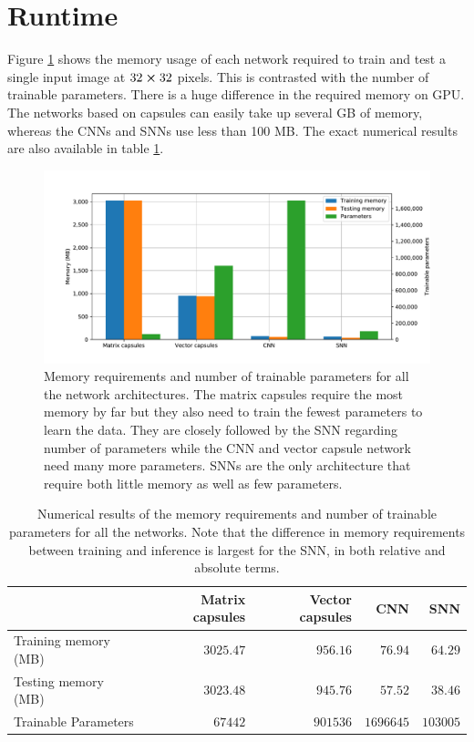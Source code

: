 \section{Runtime}
Figure \ref{fig:memory} shows the memory usage of each network required to train and test a single input image at $32\cross 32$ pixels. This is contrasted with the number of trainable parameters. There is a huge difference in the required memory on GPU. The networks based on capsules can easily take up several GB of memory, whereas the CNNs and SNNs use less than 100 MB. The exact numerical results are also available in table \ref{tab:memory}.
\begin{figure}[H]
    \centering
\includegraphics[clip,trim=1.5cm 0 0 0,width=\textwidth]{figures/memory.pdf}
\caption[Memory requirements and number of trainable parameters for all the networks]{Memory requirements and number of trainable parameters for all the network architectures. The matrix capsules require the most memory by far but they also need to train the fewest parameters to learn the data. They are closely followed by the SNN regarding number of parameters while the CNN and vector capsule network need many more parameters. SNNs are the only architecture that require both little memory as well as few parameters.}\label{fig:memory}
\end{figure}\noindent
\begin{table}[htp!]
\centering
\begin{tabular}{@{}lrrrr@{}}
\toprule
                     & Matrix capsules & Vector capsules & CNN             & SNN            \\ \midrule
Training memory (MB)      & $\num{3025.47}$        & $\num{956.16}$         & $\num{76.94}$   & $\num{64.29}$  \\
Testing memory (MB)       & $\num{3023.48}$        & $\num{945.76}$         & $\num{57.52}$   & $\num{38.46}$  \\
Trainable Parameters & $\num{67442}$          & $\num{901536}$         & $\num{1696645}$ & $\num{103005}$ \\ \bottomrule
\end{tabular}
\caption[Numerical results of the memory requirements and number of trainable parameters for all the networks]{Numerical results of the memory requirements and number of trainable parameters for all the networks. Note that the difference in memory requirements between training and inference is largest for the SNN, in both relative and absolute terms.}
\label{tab:memory}
\end{table}\newpage\noindent
